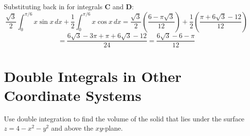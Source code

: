 \begin{Answer}[ref = fubini_2]
\begin{enumerate}
Substituting back in for integrals \textbf{C} and \textbf{D}:
$$\frac{\sqrt{3}}{2} \int_0^{\pi/6} x \sin{x}\,dx + \frac{1}{2} \int_0^{\pi/6} 
x \cos{x}\,dx = \frac{\sqrt{3}}{2} \left( \frac{6 - \pi \sqrt{3}}{12} \right) 
+ \frac{1}{2} \left( \frac{\pi + 6\sqrt{3}- 12}{12} \right)$$
$$= \frac{6 \sqrt{3} - 3\pi + \pi + 6\sqrt{3} - 12}{24} = \frac{6 \sqrt{3} - 6 
- \pi}{12}$$
\end{enumerate}
\end{Answer}

\section{Double Integrals in Other Coordinate Systems}
\begin{Exercise}[title={Using Polar Coordinates in Multiple Integration}, 
label=polarmulti]

\Question Use double integration to find the volume of the solid that lies under the surface $z = 4 - x^2 - y^2$ and above the $xy$-plane.

\end{Exercise}
